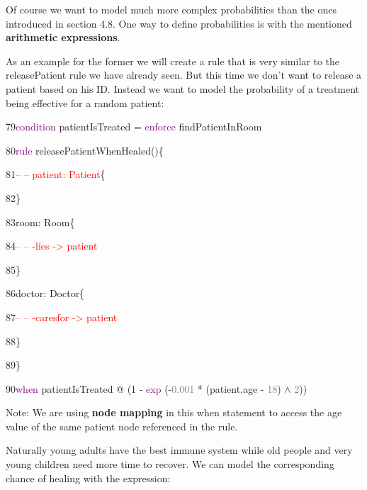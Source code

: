 Of course we want to model much more complex probabilities than the ones introduced in section 4.8.
One way to define probabilities is with the mentioned \textbf{arithmetic expressions}.

As an example for the former we will create a rule that is very similar to the \textsf{releasePatient} rule we have already seen. But this time we don't want to release a patient based on his ID. Instead we want to model the probability of a treatment being effective for a random patient:\newline

{

79\hspace{0.5cm}\textcolor{Purple}{condition} patientIsTreated = \textcolor{Purple}{enforce} findPatientInRoom 

80\hspace{0.5cm}\textcolor{Purple}{rule} releasePatientWhenHealed()\{

81\hspace{1cm}\textcolor{red}{-- -- patient: Patient}\{

82\hspace{1cm}\}

83\hspace{1cm}room: Room\{

84\hspace{1.5cm}\textcolor{red}{-- -- -lies -> patient}

85\hspace{1cm}\}

86\hspace{1cm}doctor: Doctor\{

87\hspace{1.5cm}\textcolor{red}{-- -- -caresfor -> patient}

88\hspace{1cm}\}

89\hspace{0.5cm}\}

90\hspace{0.5cm}\textcolor{Purple}{when} patientIsTreated @ (1 - \textcolor{Purple}{exp} (-\textcolor{Grey}{0.001} * (patient.age - \textcolor{Grey}{18}) $\wedge$ \textcolor{Grey}{2}))\newline

}
Note: We are using \textbf{node mapping} in this when statement to access the \textsf{age} value of the same patient node referenced in the rule.\newline

Naturally young adults have the best immune system while old people and very young children need more time to recover. We can model the corresponding chance of healing with the expression:

